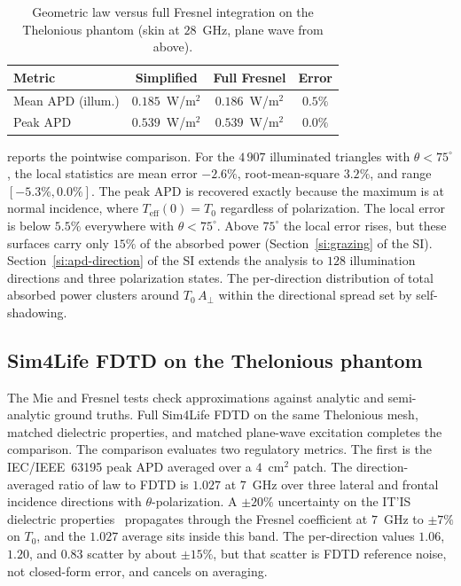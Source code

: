 \documentclass[journal,twocolumn,10pt]{IEEEtran}
\newcommand{\APD}{\mathrm{APD}}
\newcommand{\Aperp}{A_\perp}
\newcommand{\Teff}{T_{\mathrm{eff}}}
\begin{document}
\begin{table}[!t]
\centering
\caption{Geometric law versus full Fresnel integration on the
Thelonious phantom (skin at $28$~GHz, plane wave from above).}
\label{tab:phantom}
\begin{tabular}{lccc}
\toprule
Metric & Simplified & Full Fresnel & Error \\
\midrule
Mean $\APD$ (illum.)     & $0.185$~W/m$^2$ & $0.186$~W/m$^2$ & $0.5\%$ \\
Peak $\APD$              & $0.539$~W/m$^2$ & $0.539$~W/m$^2$ & $0.0\%$ \\
\bottomrule
\end{tabular}
\end{table}

 reports the pointwise comparison. For the
$4\,907$ illuminated triangles with
$\theta < 75^\circ$, the local statistics are mean error $-2.6\%$,
root-mean-square $3.2\%$, and range $[-5.3\%, 0.0\%]$. The peak
$\APD$ is recovered exactly because the maximum is at normal incidence,
where $\Teff(0) = T_0$ regardless of polarization. The local error is
below $5.5\%$ everywhere with $\theta < 75^\circ$. Above $75^\circ$
the local error rises, but these surfaces carry only $15\%$ of the
absorbed power (Section~\ref{si:grazing} of the SI).
Section~\ref{si:apd-direction} of the SI extends the analysis to
$128$ illumination directions and three polarization states. The
per-direction distribution of total absorbed power clusters around
$T_0\,\Aperp$ within the directional spread set by self-shadowing.

\subsection{Sim4Life FDTD on the Thelonious phantom}\label{subsec:val-fdtd}

The Mie and Fresnel tests check approximations against analytic and
semi-analytic ground truths. Full Sim4Life FDTD on the same
Thelonious mesh, matched dielectric properties, and matched
plane-wave excitation completes the comparison. The comparison
evaluates two regulatory metrics. The first is the IEC/IEEE~63195 peak
$\APD$ averaged over a $4$~cm$^2$ patch. The direction-averaged ratio
of law to FDTD is $1.027$ at $7$~GHz over three lateral and frontal
incidence directions with $\theta$-polarization. A
$\pm 20\%$ uncertainty on the IT'IS dielectric properties~\cite{ITISv5,Gabriel1996} propagates
through the Fresnel coefficient at $7$~GHz to $\pm 7\%$ on
$T_0$, and the $1.027$ average sits inside this band. The
per-direction values $1.06$, $1.20$, and $0.83$ scatter by about
$\pm 15\%$, but that scatter is FDTD reference noise, not closed-form
error, and cancels on averaging.
\end{document}
